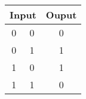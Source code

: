 \documentclass{standalone}
\begin{document}
	\begin{tabular}{ccc}
		\toprule
			\multicolumn{2}{c}{Input} & Ouput\\
		\midrule
			0 & 0 & 0\\
			0 & 1 & 1\\
			1 & 0 & 1\\
			1 & 1 & 0\\
		\bottomrule
	\end{tabular}
\end{document}
